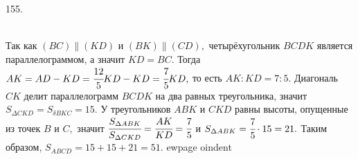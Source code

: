 155. \begin{figure}[ht!]
\end{figure}\\
Так как $(BC)\parallel (KD)$ и $(BK)\parallel(CD),$ четырёхугольник $BCDK$ является параллелограммом, а значит $KD=BC.$ Тогда $AK=AD-KD=\cfrac{12}{5}KD-KD=\cfrac{7}{5}KD,$ то есть $AK:KD=7:5.$ Диагональ $CK$ делит параллелограмм $BCDK$ на два равных треугольника, значит $S_{\Delta CKD}=S_{\delta BKC}=15.$ У треугольников $ABK$ и $CKD$ равны высоты, опущенные из точек $B$ и $C,$ значит $\cfrac{S_{\Delta ABK}}{S_{\Delta CKD}}=\cfrac{AK}{KD}=\cfrac{7}{5}$ и $S_{\Delta ABK}=\cfrac{7}{5}\cdot15=21.$ Таким образом, $S_{ABCD}=15+15+21=51.$
ewpage
oindent
